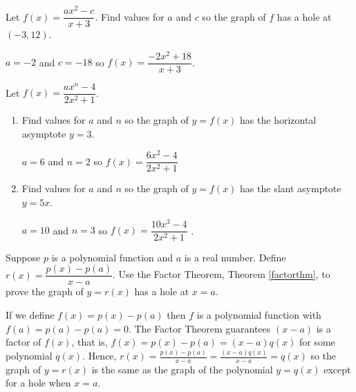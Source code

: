 \documentclass{ximera}
\begin{document}
\begin{problem}
Let $f(x) = \dfrac{ax^2-c}{x+3}$.  Find values  for $a$ and  $c$ so  the graph of $f$ has a hole  at $(-3, 12)$.

\begin{solution}
    $a = -2$ and $c = -18$ so $f(x) = \dfrac{-2x^2+18}{x+3}$.
\end{solution}
\end{problem}

\begin{problem}
Let $f(x) = \dfrac{ax^{n} -4}{2x^2+1}$.

\begin{enumerate}

\item  Find values for $a$ and $n$ so the graph of $y = f(x)$  has the horizontal asymptote $y = 3$.

\begin{solution}
    $a=6$ and $n=2$ so $f(x) = \dfrac{6x^{2} -4}{2x^2+1}$
\end{solution}

\item  Find values for $a$ and $n$ so the graph of  $y=f(x)$ has the slant asymptote $y = 5x$.

\begin{solution}
    $a=10$ and $n = 3$ so $f(x) = \dfrac{10x^{3} -4}{2x^2+1}$ .

\end{solution}

\end{enumerate}
\end{problem}

\begin{problem}
Suppose $p$ is a polynomial function and $a$ is a real number.  Define $r(x)= \dfrac{p(x) - p(a)}{x-a}$.  Use the Factor Theorem, Theorem \ref{factorthm}, to prove the graph of $y = r(x)$ has a hole at $x =a$.

\begin{solution}
    If we define $f(x) = p(x) - p(a)$ then $f$ is a polynomial function with $f(a) = p(a) - p(a) = 0$.  The Factor Theorem guarantees $(x-a)$ is a factor of $f(x)$, that is, $f(x) = p(x) - p(a) = (x-a)q(x)$ for some polynomial $q(x)$. Hence, $r(x) = \frac{p(x)-p(a)}{x-a} = \frac{(x-a)q(x)}{x-a} = q(x)$ so the graph of $y = r(x)$ is the same as the graph of the polynomial $y = q(x)$ except for a hole when $x = a$.
\end{solution}
\end{problem}
\end{document}
